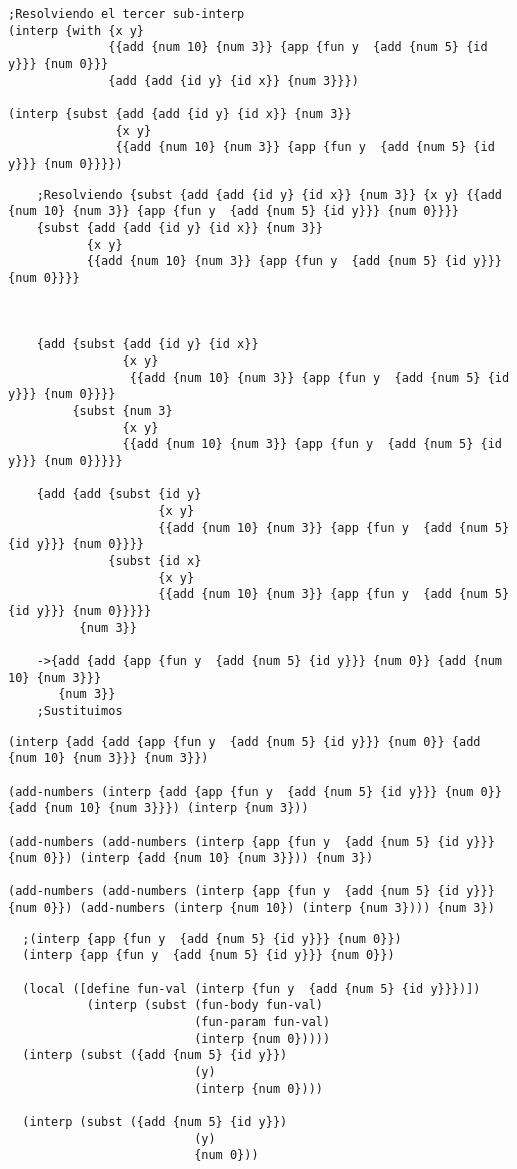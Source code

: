 \documentclass[a4paper]{article}
\begin{document}
\color{blue}
\begin{verbatim}
;Resolviendo el tercer sub-interp
(interp {with {x y}
              {{add {num 10} {num 3}} {app {fun y  {add {num 5} {id y}}} {num 0}}}
              {add {add {id y} {id x}} {num 3}}})

(interp {subst {add {add {id y} {id x}} {num 3}}
               {x y}
               {{add {num 10} {num 3}} {app {fun y  {add {num 5} {id y}}} {num 0}}}})
\end{verbatim}
\color{clargreen}
\begin{verbatim}
    ;Resolviendo {subst {add {add {id y} {id x}} {num 3}} {x y} {{add {num 10} {num 3}} {app {fun y  {add {num 5} {id y}}} {num 0}}}}
    {subst {add {add {id y} {id x}} {num 3}}
           {x y}
           {{add {num 10} {num 3}} {app {fun y  {add {num 5} {id y}}} {num 0}}}}



    {add {subst {add {id y} {id x}}
                {x y}
                 {{add {num 10} {num 3}} {app {fun y  {add {num 5} {id y}}} {num 0}}}}
         {subst {num 3}
                {x y}
                {{add {num 10} {num 3}} {app {fun y  {add {num 5} {id y}}} {num 0}}}}}

    {add {add {subst {id y}
                     {x y}
                     {{add {num 10} {num 3}} {app {fun y  {add {num 5} {id y}}} {num 0}}}}
              {subst {id x}
                     {x y}
                     {{add {num 10} {num 3}} {app {fun y  {add {num 5} {id y}}} {num 0}}}}}
          {num 3}}

    ->{add {add {app {fun y  {add {num 5} {id y}}} {num 0}} {add {num 10} {num 3}}}
       {num 3}}
    ;Sustituimos
\end{verbatim}
\color{blue}
\begin{verbatim}
(interp {add {add {app {fun y  {add {num 5} {id y}}} {num 0}} {add {num 10} {num 3}}} {num 3}})

(add-numbers (interp {add {app {fun y  {add {num 5} {id y}}} {num 0}} {add {num 10} {num 3}}}) (interp {num 3}))

(add-numbers (add-numbers (interp {app {fun y  {add {num 5} {id y}}} {num 0}}) (interp {add {num 10} {num 3}})) {num 3})

(add-numbers (add-numbers (interp {app {fun y  {add {num 5} {id y}}} {num 0}}) (add-numbers (interp {num 10}) (interp {num 3}))) {num 3})
\end{verbatim}
\color{clargreen}
\begin{verbatim}
  ;(interp {app {fun y  {add {num 5} {id y}}} {num 0}})
  (interp {app {fun y  {add {num 5} {id y}}} {num 0}})

  (local ([define fun-val (interp {fun y  {add {num 5} {id y}}})])
           (interp (subst (fun-body fun-val)
                          (fun-param fun-val)
                          (interp {num 0}))))
  (interp (subst ({add {num 5} {id y}})
                          (y)
                          (interp {num 0})))

  (interp (subst ({add {num 5} {id y}})
                          (y)
                          {num 0}))
\end{verbatim}
\end{document}
